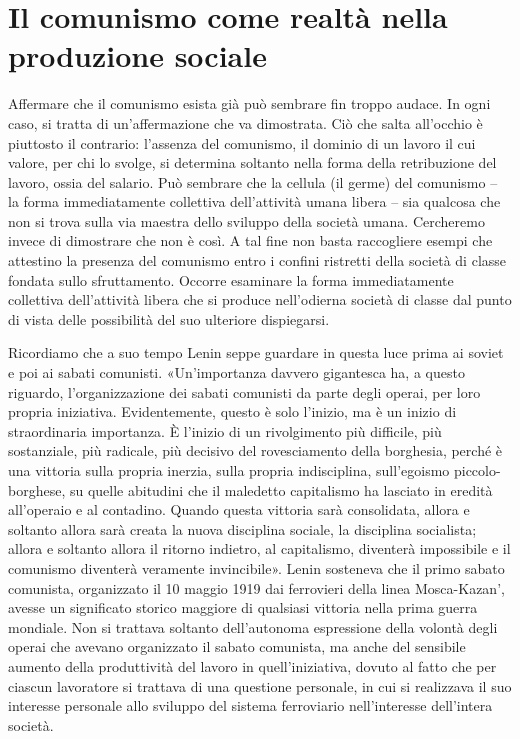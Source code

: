 \documentclass[12pt,a4paper,openany]{book}
\begin{document}
\section{Il comunismo come realtà nella produzione sociale}
\label{sec:04_comunismo_realta}

Affermare che il comunismo esista già può sembrare fin troppo audace. In ogni caso, si tratta di un'affermazione che va dimostrata. Ciò che salta all'occhio è piuttosto il contrario: l'assenza del comunismo, il dominio di un lavoro il cui valore, per chi lo svolge, si determina soltanto nella forma della retribuzione del lavoro, ossia del salario. Può sembrare che la cellula (il germe) del comunismo – la forma immediatamente collettiva dell'attività umana libera – sia qualcosa che non si trova sulla via maestra dello sviluppo della società umana. Cercheremo invece di dimostrare che non è così. A tal fine non basta raccogliere esempi che attestino la presenza del comunismo entro i confini ristretti della società di classe fondata sullo sfruttamento. Occorre esaminare la forma immediatamente collettiva dell'attività libera che si produce nell'odierna società di classe dal punto di vista delle possibilità del suo ulteriore dispiegarsi.

Ricordiamo che a suo tempo Lenin seppe guardare in questa luce prima ai soviet e poi ai sabati comunisti. «Un'importanza davvero gigantesca ha, a questo riguardo, l'organizzazione dei sabati comunisti da parte degli operai, per loro propria iniziativa. Evidentemente, questo è solo l'inizio, ma è un inizio di straordinaria importanza. È l'inizio di un rivolgimento più difficile, più sostanziale, più radicale, più decisivo del rovesciamento della borghesia, perché è una vittoria sulla propria inerzia, sulla propria indisciplina, sull'egoismo piccolo-borghese, su quelle abitudini che il maledetto capitalismo ha lasciato in eredità all'operaio e al contadino. Quando questa vittoria sarà consolidata, allora e soltanto allora sarà creata la nuova disciplina sociale, la disciplina socialista; allora e soltanto allora il ritorno indietro, al capitalismo, diventerà impossibile e il comunismo diventerà veramente invincibile». Lenin sosteneva che il primo sabato comunista, organizzato il 10 maggio 1919 dai ferrovieri della linea Mosca-Kazan', avesse un significato storico maggiore di qualsiasi vittoria nella prima guerra mondiale. Non si trattava soltanto dell'autonoma espressione della volontà degli operai che avevano organizzato il sabato comunista, ma anche del sensibile aumento della produttività del lavoro in quell'iniziativa, dovuto al fatto che per ciascun lavoratore si trattava di una questione personale, in cui si realizzava il suo interesse personale allo sviluppo del sistema ferroviario nell'interesse dell'intera società.
\end{document}
